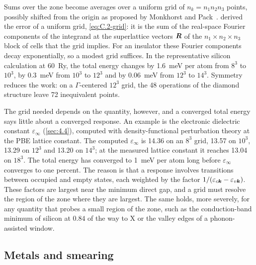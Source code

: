 Sums over the zone become averages over a uniform grid of $n_k = n_1n_2n_3$ points, possibly shifted from the origin as proposed by Monkhorst and Pack~\cite{monkhorst1976special}.  derived the error of a uniform grid, \cref{eq:C.2-grid}: it is the sum of the real-space Fourier components of the integrand at the superlattice vectors $\bm{R}$ of the $n_1\times n_2\times n_3$ block of cells that the grid implies. For an insulator these Fourier components decay exponentially, so a modest grid suffices. In the representative silicon calculation at \SI{60}{Ry}, the total energy changes by \SI{1.6}{meV} per atom from $8^3$ to $10^3$, by \SI{0.3}{meV} from $10^3$ to $12^3$ and by \SI{0.06}{meV} from $12^3$ to $14^3$. Symmetry reduces the work: on a $\Gamma$-centered $12^3$ grid, the 48 operations of the diamond structure leave 72 inequivalent points.

The grid needed depends on the quantity, however, and a converged total energy says little about a converged response. An example is the electronic dielectric constant $\varepsilon_\infty$ (\cref{sec:4.4}), computed with density-functional perturbation theory at the PBE lattice constant. The computed $\varepsilon_\infty$ is 14.36 on an $8^3$ grid, 13.57 on $10^3$, 13.29 on $12^3$ and 13.20 on $14^3$; at the measured lattice constant it reaches 13.04 on $18^3$. The total energy has converged to \SI{1}{meV} per atom long before $\varepsilon_\infty$ converges to one percent. The reason is that a response involves transitions between occupied and empty states, each weighted by the factor $1/(\varepsilon_{c\bm{k}} - \varepsilon_{v\bm{k}})$. These factors are largest near the minimum direct gap, and a grid must resolve the region of the zone where they are largest. The same holds, more severely, for any quantity that probes a small region of the zone, such as the conduction-band minimum of silicon at $0.84$ of the way to X or the valley edges of a phonon-assisted window.

\subsection{Metals and smearing}

